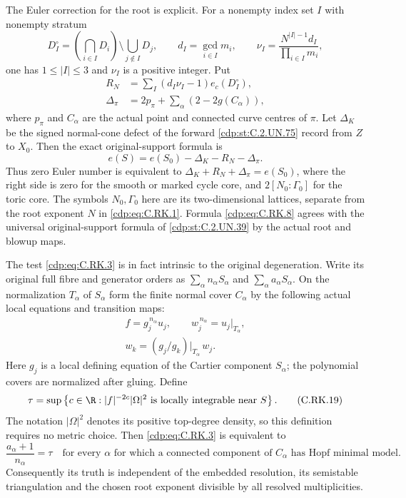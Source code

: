 \begin{proposition}
The Euler correction for the root is explicit.
For a nonempty index set $I$ with nonempty stratum
\[
 D_I^\circ=
    \left(\bigcap_{i\in I}D_i\right)
           \setminus\bigcup_{j\notin I}D_j,
 \qquad d_I=\gcd_{i\in I}m_i,
 \qquad \nu_I=\frac{N^{|I|-1}d_I}{\prod_{i\in I}m_i},
\tag{C.RK.6}\label{cdp:eq:C.RK.6}
\]
one has $1\le|I|\le3$ and $\nu_I$ is a positive
integer. Put
\[
 \begin{split}
 R_N&=\sum_I(d_I\nu_I-1)e_c(D_I^\circ),\\
 \Delta_\pi&=2p_\pi+
                   \sum_\alpha(2-2g(C_\alpha)),
 \end{split}
\tag{C.RK.7}\label{cdp:eq:C.RK.7}
\]
where $p_\pi$ and $C_\alpha$ are the actual point
and connected curve centres of $\pi$. Let
$\Delta_K$ be the signed normal-cone defect of
the forward \ref{cdp:st:C.2.UN.75} record from $Z$ to $X_0$.
Then the exact original-support formula is
\[
                e(S)=e(S_0)-\Delta_K-R_N-\Delta_\pi.
\tag{C.RK.8}\label{cdp:eq:C.RK.8}
\]
Thus zero Euler number is equivalent to
$\Delta_K+R_N+\Delta_\pi=e(S_0)$, where the
right side is zero for the smooth or marked
cycle core, and $2[N_0:\Gamma_0]$ for the
toric core. The symbols $N_0,\Gamma_0$ here
are its two-dimensional lattices, separate
from the root exponent $N$ in \eqref{cdp:eq:C.RK.1}.
Formula \eqref{cdp:eq:C.RK.8} agrees with the universal
original-support formula of \ref{cdp:st:C.2.UN.39} by the
actual root and blowup maps.

The test \eqref{cdp:eq:C.RK.3} is in fact intrinsic to
the original degeneration. Write its original
full fibre and generator orders as
$\sum_\alpha n_\alpha S_\alpha$ and
$\sum_\alpha a_\alpha S_\alpha$.
On the normalization $T_\alpha$ of $S_\alpha$
form the finite normal cover $C_\alpha$
by the following actual local equations
and transition maps:
\[
 \begin{gathered}
 f=g_j^{\,n_\alpha}u_j,\qquad
 w_j^{\,n_\alpha}=u_j|_{T_\alpha},\\
 w_k=(g_j/g_k)|_{T_\alpha}\,w_j .
 \end{gathered}
\tag{C.RK.18}\label{cdp:eq:C.RK.18}
\]
Here $g_j$ is a local defining equation
of the Cartier component $S_\alpha$;
the polynomial covers are normalized
after gluing. Define
\[
 \tau=\sup\left\{c\in\R:
       |f|^{-2c}|\Omega|^2\text{ is locally integrable
                              near }S\right\}.
\tag{C.RK.19}\label{cdp:eq:C.RK.19}
\]
The notation $|\Omega|^2$ denotes its
positive top-degree density, so this
definition requires no metric choice.
Then \eqref{cdp:eq:C.RK.3} is equivalent to
\[
 \frac{a_\alpha+1}{n_\alpha}=\tau
 \quad\text{for every }\alpha\text{ for which a connected
 component of }C_\alpha\text{ has Hopf minimal model}.
\tag{C.RK.20}\label{cdp:eq:C.RK.20}
\]
Consequently its truth is independent
of the embedded resolution, its
semistable triangulation and the
chosen root exponent divisible by
all resolved multiplicities.


\end{proposition}
